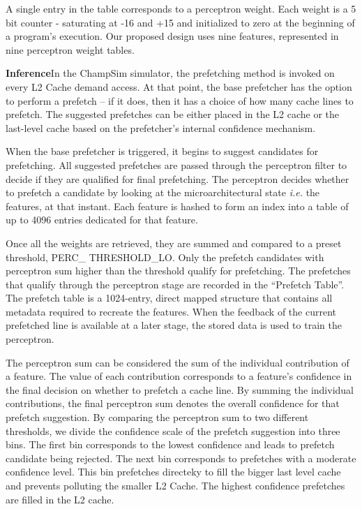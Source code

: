 A single entry in the table corresponds to a perceptron weight.  Each
weight is a 5 bit counter - saturating at -16 and +15 and initialized
to zero at the beginning of a program's execution. Our proposed design
uses nine features, represented in nine perceptron weight
tables. 

 \textbf{Inference}\newline In the ChampSim simulator, the
prefetching method is invoked on every L2 Cache demand access.  At
that point, the base prefetcher has the option to perform a prefetch
-- if it does, then it has a choice of how many cache lines to
prefetch.  The suggested prefetches can be either placed in the L2
cache or the last-level cache based on the prefetcher's internal
confidence mechanism.


When the base prefetcher is triggered, it begins to suggest candidates
for prefetching.  All suggested prefetches are passed through the
perceptron filter to decide if they are qualified for final
prefetching.  The perceptron decides whether to prefetch a candidate
by looking at the microarchitectural state \textit{i.e.} the features,
at that instant.  Each feature is hashed to form an index into a table
of up to 4096 entries dedicated for that feature.

Once all the weights are retrieved, they are summed and compared to a
preset threshold, PERC\_ THRESHOLD\_LO.  Only the prefetch candidates
with perceptron sum higher than the threshold qualify for prefetching.
The prefetches that qualify through the perceptron stage are recorded
in the ``Prefetch Table''. The prefetch table is a 1024-entry, direct
mapped structure that contains all metadata required to recreate the
features.  %
When the feedback of the current prefetched line is available at a
later stage, the stored data is used to train the perceptron.


The perceptron sum can be considered the sum of the individual
contribution of a feature.  The value of each contribution corresponds
to a feature's confidence in the final decision on whether to prefetch
a cache line. By summing the individual contributions, the final
perceptron sum denotes the overall confidence for that prefetch
suggestion.  By comparing the perceptron sum to two different
thresholds, we divide the confidence scale of the prefetch suggestion
into three bins. The first bin corresponds to the lowest confidence
and leads to prefetch candidate being rejected.  The next bin
corresponds to prefetches with a moderate confidence level.  This bin
prefetches directeky to fill the bigger last level cache and prevents
polluting the smaller L2 Cache.  The highest confidence prefetches are
filled in the L2 cache.

